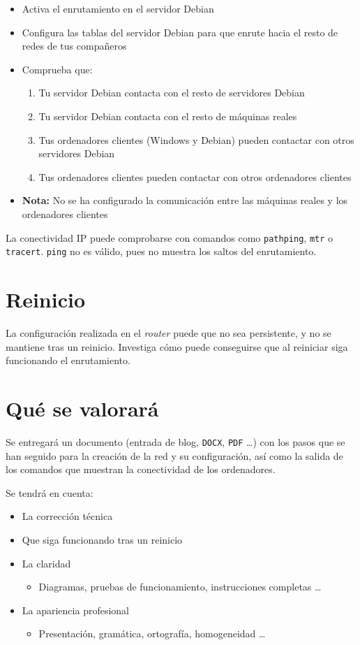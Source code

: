 \begin{itemize}
\item Activa el enrutamiento en el servidor Debian
\item Configura las tablas del servidor Debian para que enrute hacia el resto de redes de tus compañeros
\item Comprueba que:
  \begin{enumerate}
  \item Tu servidor Debian contacta con el resto de servidores Debian
  \item Tu servidor Debian contacta con el resto de máquinas reales
  \item Tus ordenadores clientes (Windows y Debian) pueden contactar con otros servidores Debian
  \item Tus ordenadores clientes pueden contactar con otros ordenadores clientes
  \end{enumerate}
\item \textbf{Nota:} No se ha configurado la comunicación entre las máquinas reales y los ordenadores clientes
\end{itemize}

La conectividad IP puede comprobarse con comandos como \texttt{pathping}, \texttt{mtr} o \texttt{tracert}. \texttt{ping} no es válido, pues no muestra los saltos del enrutamiento.

\section{Reinicio}
La configuración realizada en el \textit{router} puede que no sea persistente, y no se mantiene tras un reinicio. Investiga cómo puede conseguirse que al reiniciar siga funcionando el enrutamiento.

\section{Qué se valorará}
Se entregará un documento (entrada de blog, \texttt{DOCX}, \texttt{PDF} \ldots) con los pasos que se han seguido para la creación de la red y su configuración, así como la salida de los comandos que muestran la conectividad de los ordenadores.

Se tendrá en cuenta:
\begin{itemize}
\item La corrección técnica
\item Que siga funcionando tras un reinicio  
\item La claridad
  \begin{itemize}
  \item Diagramas, pruebas de funcionamiento, instrucciones completas \ldots
  \end{itemize}
\item La apariencia profesional
  \begin{itemize}
  \item Presentación, gramática, ortografía, homogeneidad \ldots
  \end{itemize}

\end{itemize}



